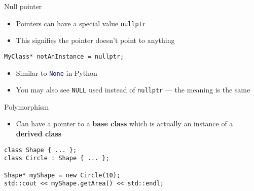 \begin{frame}[fragile]{Null pointer}
    \begin{itemize}
        \item Pointers can have a special value \lstinline{nullptr} \pause
        \item This signifies the pointer doesn't point to anything \pause
    \end{itemize}
    \begin{lstlisting}
MyClass* notAnInstance = nullptr;
    \end{lstlisting}
    \pause
    \begin{itemize}
        \item Similar to \lstinline[language=Python]{None} in Python \pause
        \item You may also see \lstinline{NULL} used instead of \lstinline{nullptr} ---
            the meaning is the same
    \end{itemize}
\end{frame}


\begin{frame}[fragile]{Polymorphism}
    \begin{itemize}
        \item Can have a pointer to a \textbf{base class} which is actually an instance of a \textbf{derived class}
    \end{itemize}
    \begin{lstlisting}
class Shape { ... };
class Circle : Shape { ... };

Shape* myShape = new Circle(10);
std::cout << myShape.getArea() << std::endl;
    \end{lstlisting}
\end{frame}
